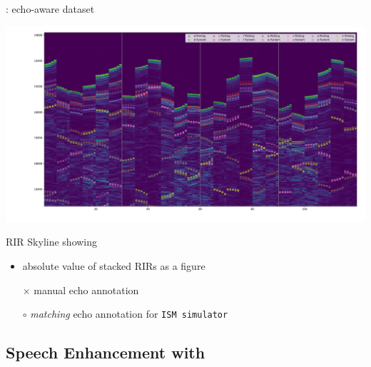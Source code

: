 \begin{frame}{\dechorate: echo-aware dataset \hfill\faTint}

    \begin{center}
        \includegraphics[trim={10em 0 0 0},clip,width=\linewidth]{figures/dechorate/rir_skyline_final_mod4paper.pdf}
    \end{center}

    \vspace*{-2mm}
    RIR Skyline showing
    \begin{itemize}
        \item absolute value of stacked RIRs as a figure
        \item[$\times$] manual echo annotation
        \item[$\circ$] \textit{matching} echo annotation for \texttt{ISM simulator}
    \end{itemize}
\end{frame}

\subsection{Speech Enhancement with \dechorate}

